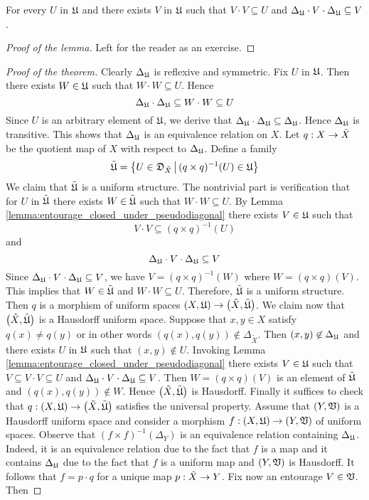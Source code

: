 \begin{lemma}\label{lemma:entourage_closed_under_pseudodiagonal}
For every $U$ in ${\mathfrak U}$ and there exists $V$ in ${\mathfrak U}$ such that $V\cdot V\subseteq U$ and $\Delta_{{\mathfrak U}}\cdot V\cdot \Delta_{{\mathfrak U}}\subseteq V$.
\end{lemma}
\begin{proof}[Proof of the lemma]
Left for the reader as an exercise.
\end{proof}

\begin{proof}[Proof of the theorem]
Clearly $\Delta_{{\mathfrak U}}$ is reflexive and symmetric. Fix $U$ in ${\mathfrak U}$. Then there exists $W \in {\mathfrak U}$ such that $W\cdot W\subseteq U$. Hence 
$$\Delta_{{\mathfrak U}}\cdot \Delta_{{\mathfrak U}} \subseteq W\cdot W \subseteq U$$
Since $U$ is an arbitrary element of ${\mathfrak U}$, we derive that $\Delta_{{\mathfrak U}}\cdot \Delta_{{\mathfrak U}}\subseteq \Delta_{{\mathfrak U}}$. Hence $\Delta_{{\mathfrak U}}$ is transitive. This shows that $\Delta_{{\mathfrak U}}$ is an equivalence relation on $X$. Let $q:X\rightarrow \tilde{X}$ be the quotient map of $X$ with respect to $\Delta_{{\mathfrak U}}$. Define a family
$$\tilde{{\mathfrak U}} = \big\{U \in {\mathfrak D}_{\tilde{X}}\,\big|\,(q\times q)^{-1}(U) \in {\mathfrak U}\big\}$$
We claim that $\tilde{{\mathfrak U}}$ is a uniform structure. The nontrivial part is verification that for $U$ in $\tilde{{\mathfrak U}}$ there exists $W \in \tilde{{\mathfrak U}}$ such that $W\cdot W \subseteq U$. By Lemma \ref{lemma:entourage_closed_under_pseudodiagonal} there exists $V\in {\mathfrak U}$ such that 
$$V\cdot V\subseteq \left(q\times q\right)^{-1}(U)$$ 
and 
$$\Delta_{{\mathfrak U}}\cdot V\cdot \Delta_{{\mathfrak U}}\subseteq V$$
Since $\Delta_{{\mathfrak U}} \cdot V\cdot \Delta_{{\mathfrak U}}\subseteq V$, we have $V = \left(q\times q\right)^{-1}(W)$ where $W = \left(q\times q\right)\left(V\right)$. This implies that $W \in \tilde{{\mathfrak U}}$ and $W\cdot W\subseteq U$. Therefore, $\tilde{{\mathfrak U}}$ is a uniform structure. Then $q$ is a morphism of uniform spaces $\left(X,{\mathfrak U}\right)\rightarrow \left(\tilde{X},\tilde{{\mathfrak U}}\right)$. We claim now that $\left(\tilde{X},\tilde{{\mathfrak U}}\right)$ is a Hausdorff uniform space. Suppose that $x,y \in X$ satisfy $q(x)\neq q(y)$ or in other words $\left(q(x),q(y)\right)\not \in \Delta_{\tilde{X}}$. Then $(x,y) \not \in \Delta_{{\mathfrak U}}$ and there exists $U$ in ${\mathfrak U}$ such that $(x,y) \not \in U$. Invoking Lemma \ref{lemma:entourage_closed_under_pseudodiagonal} there exists $V\in {\mathfrak U}$ such that $V\subseteq V\cdot V \subseteq U$ and $\Delta_{{\mathfrak U}}\cdot V\cdot \Delta_{{\mathfrak U}}\subseteq V$. Then $W = \left(q\times q\right)(V)$ is an element of $\tilde{{\mathfrak U}}$ and $\left(q(x),q(y)\right)\not \in W$. Hence $\left(\tilde{X},\tilde{{\mathfrak U}}\right)$ is Hausdorff. Finally it suffices to check that $q:\left(X,{\mathfrak U}\right) \rightarrow \left(\tilde{X},\tilde{{\mathfrak U}}\right)$ satisfies the universal property. Assume that $\left(Y,{\mathfrak V}\right)$ is a Hausdorff uniform space and consider a morphism $f:\left(X,{\mathfrak U}\right)\rightarrow \left(Y,{\mathfrak V}\right)$ of uniform spaces. Observe that $\left(f\times f\right)^{-1}\left(\Delta_Y\right)$ is an equivalence relation containing $\Delta_{{\mathfrak U}}$. Indeed, it is an equivalence relation due to the fact that $f$ is a map and it contains $\Delta_{{\mathfrak U}}$ due to the fact that $f$ is a uniform map and $(Y,{\mathfrak V})$ is Hausdorff. It follows that $f = p\cdot q$ for a unique map $p:\tilde{X}\rightarrow Y$. Fix now an entourage $V \in {\mathfrak V}$. Then 

\end{proof}
